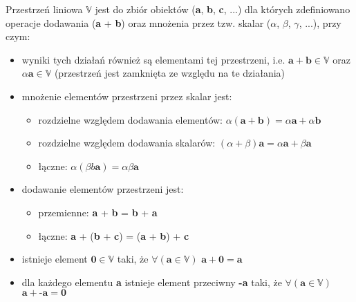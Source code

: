 \documentclass[12pt,a4paper,twoside,openany]{book}
\begin{document}
Przestrzeń liniowa $\mathbb{V}$ jest do zbiór obiektów (\textbf{a}, \textbf{b}, \textbf{c}, ...) dla których zdefiniowano operacje dodawania (\textbf{a} + \textbf{b}) oraz mnożenia przez tzw. skalar ($\alpha$, $\beta$, $\gamma$, ...), przy czym: \newline
\begin{itemize}
    \item wyniki tych działań również są elementami tej przestrzeni, i.e. $\textbf{a} + \textbf{b} \in \mathbb{V}$ oraz $\alpha\textbf{a} \in \mathbb{V}$ (przestrzeń jest zamknięta ze względu na te działania) \newline
    \item mnożenie elementów przestrzeni przez skalar jest:
    \begin{itemize}
        \item rozdzielne względem dodawania elementów: \newline
         $\alpha(\textbf{a} + \textbf{b}) = \alpha\textbf{a} + \alpha\textbf{b}$
         \item rozdzielne względem dodawania skalarów: \newline
         $(\alpha + \beta)\textbf{a} = \alpha\textbf{a} + \beta\textbf{a}$
         \item łączne: \newline
         $\alpha(\beta{b}\textbf{a}) = \alpha\beta\textbf{a}$ \newline
         
    \end{itemize}
    \item dodawanie elementów przestrzeni jest:
    \begin{itemize}
        \item przemienne: \newline
        \textbf{a} + \textbf{b} = \textbf{b} + \textbf{a}
        \item łączne: \newline
        \textbf{a} + (\textbf{b} + \textbf{c}) = (\textbf{a} + \textbf{b}) + \textbf{c} \newline
    \end{itemize}
    \item istnieje element $\textbf{0}\in\mathbb{V}$ taki, że \newline $\forall(\textbf{a}\in\mathbb{V})$  $\textbf{a} + \textbf{0} = \textbf{a}$ \newline
    \item dla każdego elementu \textbf{a} istnieje element przeciwny \textbf{-a} taki, że \newline $\forall(\textbf{a}\in\mathbb{V})$  $\textbf{a} + \textbf{-a} = \textbf{0}$ \newline
\end{itemize}
\end{document}
